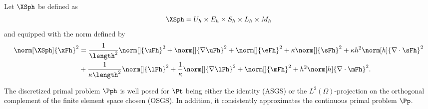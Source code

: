 \begin{definition} Let $\XSph$ be defined as
$$\XSph =  U_h\times E_h\times S_h\times L_h\times M_h$$
and equipped with the norm defined by
\begin{align*}
\norm[\XSph]{\xFh}^2 & =
\frac{1}{\length^2}\norm[]{\uFh}^2+
\norm[]{\nabla\uFh}^2+
\norm[]{\eFh}^2+
\kappa\norm[]{\sFh}^2+
\kappa h^2\norm[h]{\nabla\cdot\sFh}^2\\
& + \frac{1}{\kappa\length^2}\norm[]{\lFh}^2+
\frac{1}{\kappa}\norm[]{\nabla\lFh}^2+
\norm[]{\mFh}^2+
h^2\norm[h]{\nabla\cdot\mFh}^2.
\end{align*}
\end{definition}

\begin{theorem}\label{thm:thm3}
The discretized primal problem $\Pph$ is well posed for $\Pt$ being either the identity (ASGS) or the $L^2(\Omega)$-projection on the orthogonal complement of the finite element space chosen (OSGS). In addition, it consistently approximates the continuous primal problem $\Pp$.   
\end{theorem}

